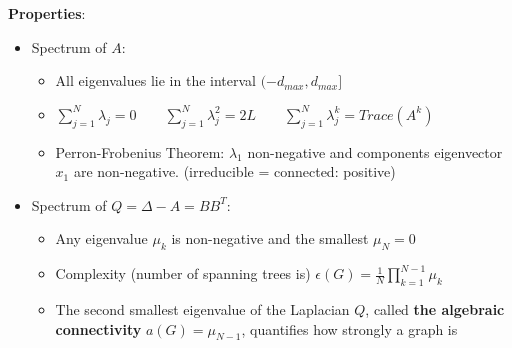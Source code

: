 \textbf{Properties}:
\begin{itemize}
  \item Spectrum of $A$:
  \begin{itemize}
    \item All eigenvalues lie in the interval $(-d_{max}, d_{max}]$
    \item $\sum_{j=1}^N \lambda_j = 0 \qquad \sum_{j=1}^N \lambda_j^2 = 2L \qquad
    \sum_{j=1}^N \lambda_j^k = Trace(A^k)$
    \item Perron-Frobenius Theorem: $\lambda_1$ non-negative and components eigenvector $x_1$ are
    non-negative. (irreducible = connected: positive)
  \end{itemize}
  \item Spectrum of $Q = \Delta - A = BB^T$:
  \begin{itemize}
    \item Any eigenvalue $\mu_k$ is non-negative and the smallest $\mu_N = 0$
    \item Complexity (number of spanning trees is) $\epsilon(G) = \frac{1}{N} \prod_{k=1}^{N-1} \mu_k$
    \item The second smallest eigenvalue of the Laplacian $Q$, called \textbf{the algebraic 
    connectivity} $a(G) = \mu_{N-1}$, quantifies how strongly a graph is 
  \end{itemize}
\end{itemize}


